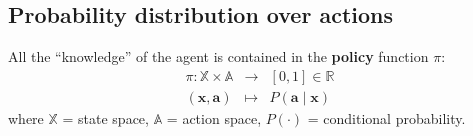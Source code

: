 \documentclass[orivec]{llncs}
\newcommand{\vect}[1]{\boldsymbol{#1}}
\begin{document}

\subsection{Probability distribution over actions}
\label{sec:Gaussian-kernels}

All the ``knowledge'' of the agent is contained in the \textbf{policy} function $\pi$:
\begin{eqnarray}
\pi: \mathbb{X} \times \mathbb{A} &\rightarrow& [0,1] \in \mathbb{R} \nonumber \\
(\vect{x},\vect{a}) &\mapsto& P(\vect{a} \;|\; \vect{x})
\end{eqnarray}
where $\mathbb{X}$ = state space, $\mathbb{A}$ = action space, $P(\cdot)$ = conditional probability.
\end{document}
